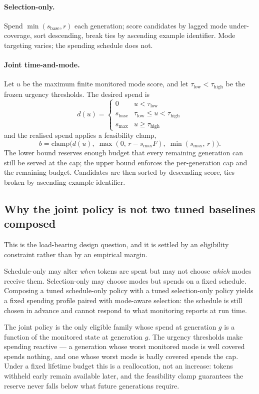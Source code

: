 \paragraph{Selection-only.} Spend $\min(s_{\text{base}}, r)$ each generation; score
candidates by lagged mode under-coverage, sort descending, break ties by ascending example
identifier. Mode targeting varies; the spending schedule does not.

\paragraph{Joint time-and-mode.} Let $u$ be the maximum finite monitored mode score, and let
$\tau_{\text{low}} < \tau_{\text{high}}$ be the frozen urgency thresholds. The desired spend
is
\[
d(u) = \begin{cases}
0 & u < \tau_{\text{low}}\\
s_{\text{base}} & \tau_{\text{low}} \le u < \tau_{\text{high}}\\
s_{\max} & u \ge \tau_{\text{high}}
\end{cases}
\]
and the realised spend applies a feasibility clamp,
\[
b = \mathrm{clamp}\bigl(d(u),\; \max(0,\, r - s_{\max}F),\; \min(s_{\max},\, r)\bigr).
\]
The lower bound reserves enough budget that every remaining generation can still be served
at the cap; the upper bound enforces the per-generation cap and the remaining budget.
Candidates are then sorted by descending score, ties broken by ascending example identifier.

\subsection{Why the joint policy is not two tuned baselines composed}

This is the load-bearing design question, and it is settled by an eligibility constraint
rather than by an empirical margin.

Schedule-only may alter \emph{when} tokens are spent but may not choose \emph{which} modes
receive them. Selection-only may choose modes but spends on a fixed schedule. Composing a
tuned schedule-only policy with a tuned selection-only policy yields a fixed spending
profile paired with mode-aware selection: the schedule is still chosen in advance and cannot
respond to what monitoring reports at run time.

The joint policy is the only eligible family whose spend at generation $g$ is a function of
the monitored state at generation $g$. The urgency thresholds make spending reactive --- a
generation whose worst monitored mode is well covered spends nothing, and one whose worst
mode is badly covered spends the cap. Under a fixed lifetime budget this is a reallocation,
not an increase: tokens withheld early remain available later, and the feasibility clamp
guarantees the reserve never falls below what future generations require.

